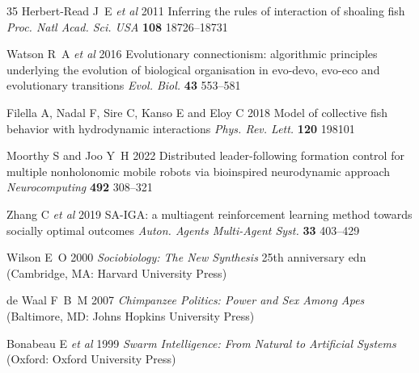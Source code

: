 \documentclass[12pt]{article}
\begin{document}
\begin{thebibliography}{35}
Herbert-Read J~E \emph{et al} 2011 Inferring the rules of interaction of shoaling fish \emph{Proc. Natl Acad. Sci. USA} \textbf{108} 18726--18731

Watson R~A \emph{et al} 2016 Evolutionary connectionism: algorithmic principles underlying the evolution of biological organisation in evo-devo, evo-eco and evolutionary transitions \emph{Evol. Biol.} \textbf{43} 553--581

Filella A, Nadal F, Sire C, Kanso E and Eloy C 2018 Model of collective fish behavior with hydrodynamic interactions \emph{Phys. Rev. Lett.} \textbf{120} 198101

Moorthy S and Joo Y~H 2022 Distributed leader-following formation control for multiple nonholonomic mobile robots via bioinspired neurodynamic approach \emph{Neurocomputing} \textbf{492} 308--321

Zhang C \emph{et al} 2019 SA-IGA: a multiagent reinforcement learning method towards socially optimal outcomes \emph{Auton. Agents Multi-Agent Syst.} \textbf{33} 403--429

Wilson E~O 2000 \emph{Sociobiology: The New Synthesis} 25th anniversary edn (Cambridge, MA: Harvard University Press)

de Waal F~B~M 2007 \emph{Chimpanzee Politics: Power and Sex Among Apes} (Baltimore, MD: Johns Hopkins University Press)

Bonabeau E \emph{et al} 1999 \emph{Swarm Intelligence: From Natural to Artificial Systems} (Oxford: Oxford University Press)

\end{thebibliography}
\end{document}
